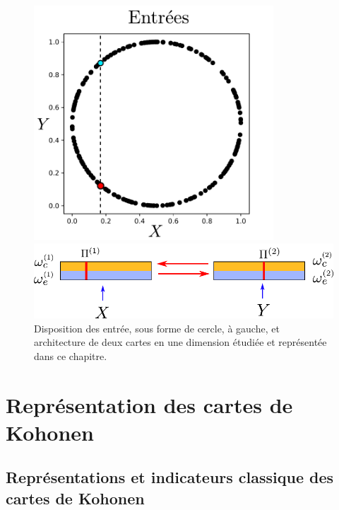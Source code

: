 \begin{figure}
\begin{minipage}{0.4\textwidth}
\centering
\includegraphics[width=0.8\textwidth]{2som_inp_noinformation}
\end{minipage}
\begin{minipage}{0.6\textwidth}
\includegraphics[width=\textwidth]{2som_archi}
\end{minipage}
\caption{Disposition des entrée, sous forme de cercle, à gauche, et architecture de deux cartes en une dimension étudiée et représentée dans ce chapitre.\label{fig:exp}}
\end{figure}
\section{Représentation des cartes de Kohonen}
\subsection{Représentations et indicateurs classique des cartes de Kohonen}

